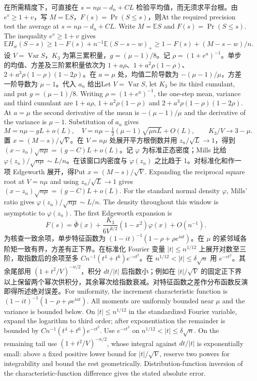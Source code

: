 \documentclass[UTF8,fontset=fandol,11pt]{ctexart}
\newcommand{\bi}[2]{\ifdefined\ResearchPaperChinese #1\else #2\fi}
\begin{document}
\bi{在所需精度下，可直接在 $s=n\mu-d_n+CL$ 检验平均值，而无须求平台根。由 $e^v\ge1+v$，写 $M=\mathbb ES$，$F(s)=\Pr(S\le s)$，则}{At the required precision test the average at $s=n\mu-d_n+CL$. Write $M=\mathbb ES$ and $F(s)=\Pr(S\le s)$. The inequality $e^v\ge1+v$ gives}
\[
 \mathbb EH_w(S-s)\ge 1-F(s)+n^{-1}\mathbb E(S-s-w)_+
 \ge 1-F(s)+(M-s-w)/n.
\]
\bi{设 $V=\operatorname{Var}S$，$K_3$ 为第三累积量，$g=(\mu-1)/8$。记 $\rho=(1+e^a)^{-1}$。单步的均值、方差及三阶累积量依次为 $1+a\rho$、$1+a^2\rho(1-\rho)$、$2+a^3\rho(1-\rho)(1-2\rho)$。在 $a=\mu$ 处，均值二阶导数为 $-(\mu-1)/\mu$，方差一阶导数为 $\mu-1$。代入 $a_n$ 给出}{Let $V=\operatorname{Var}S$, let $K_3$ be its third cumulant, and put $g=(\mu-1)/8$. Writing $\rho=(1+e^a)^{-1}$, the one-step mean, variance and third cumulant are $1+a\rho$, $1+a^2\rho(1-\rho)$ and $2+a^3\rho(1-\rho)(1-2\rho)$. At $a=\mu$ the second derivative of the mean is $-(\mu-1)/\mu$ and the derivative of the variance is $\mu-1$. Substitution of $a_n$ gives}
\[
 M=n\mu-g L+o(L),\quad V=n\mu-\tfrac12(\mu-1)\sqrt{\mu n L}+O(L),
 \qquad K_3/V\longrightarrow 3-\mu .
\]
\bi{置 $x=(M-s)/\sqrt V$。在 $V=n\mu$ 处展开平方根倒数并用 $z_n/\sqrt L\to1$，得到 $(x-z_n)\sqrt{n\mu}=(g-C)L+o(L)$。记 $\varphi$ 为标准正态密度；Mills 比给 $\varphi(z_n)/\sqrt{n\mu}\sim L/n$。在该窗口内密度与 $\varphi(z_n)$ 之比趋于 1。对标准化和作一项 Edgeworth 展开，得}{Put $x=(M-s)/\sqrt V$. Expanding the reciprocal square root at $V=n\mu$ and using $z_n/\sqrt L\to1$ gives $(x-z_n)\sqrt{n\mu}=(g-C)L+o(L)$. For the standard normal density $\varphi$, Mills' ratio gives $\varphi(z_n)/\sqrt{n\mu}\sim L/n$. The density throughout this window is asymptotic to $\varphi(z_n)$. The first Edgeworth expansion is}
\[
 F(s)=\bar\Phi(x)+\frac{K_3}{6V^{3/2}}(1-x^2)\varphi(x)+O(n^{-1}).
\]
\bi{为核查一致余项，单步特征函数为 $(1-it)^{-1}(1-\rho+\rho e^{iat})$。在 $\mu$ 的紧邻域各阶矩一致有界，方差有正下界。在标准化 Fourier 变量 $|t|\le n^{1/12}$ 上展开对数至三阶，取指数后的余项至多 $Cn^{-1}(t^4+t^6)e^{-ct^2}$。在 $n^{1/12}<|t|\le\delta\sqrt n$ 用 $e^{-ct^2}$。其余尾部用 $(1+t^2/V)^{-n/2}$，积分 $dt/|t|$ 后指数小；例如在 $|t|/\sqrt V$ 的固定正下界以上保留两个幂次供积分，其余幂次给指数衰减。对特征函数之差作分布函数反演即得所述绝对误差。}{For uniformity, the increment characteristic function is $(1-it)^{-1}(1-\rho+\rho e^{iat})$. All moments are uniformly bounded near $\mu$ and the variance is bounded below. On $|t|\le n^{1/12}$ in the standardized Fourier variable, expand the logarithm to third order; after exponentiation the remainder is bounded by $Cn^{-1}(t^4+t^6)e^{-ct^2}$. Use $e^{-ct^2}$ on $n^{1/12}<|t|\le\delta\sqrt n$. On the remaining tail use $(1+t^2/V)^{-n/2}$, whose integral against $dt/|t|$ is exponentially small: above a fixed positive lower bound for $|t|/\sqrt V$, reserve two powers for integrability and bound the rest geometrically. Distribution-function inversion of the characteristic-function difference gives the stated absolute error.}
\end{document}
